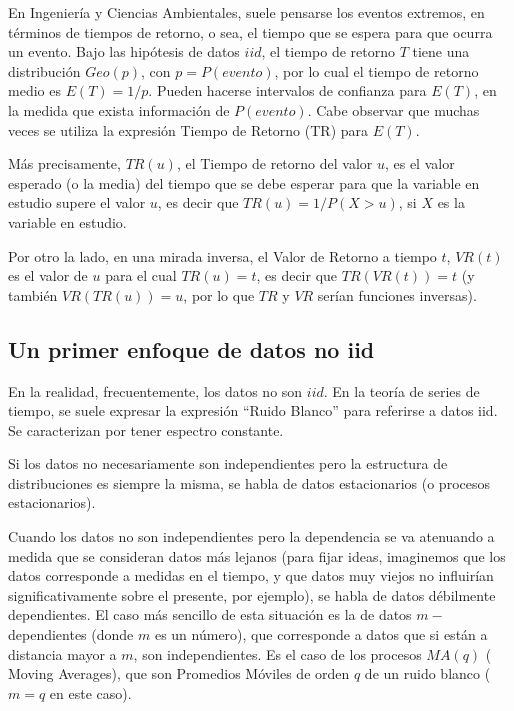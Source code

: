 \documentclass[
  12pt]{article}
\begin{document}
En Ingeniería y Ciencias Ambientales, suele pensarse los eventos
extremos, en términos de tiempos de retorno, o sea, el tiempo que se
espera para que ocurra un evento. Bajo las hipótesis de datos \(iid\),
el tiempo de retorno \(T\) tiene una distribución \(Geo(p)\), con
\(p = P(evento)\), por lo cual el tiempo de retorno medio es
\(E(T)=1/p\). Pueden hacerse intervalos de confianza para \(E(T)\), en
la medida que exista información de \(P(evento)\). Cabe observar que
muchas veces se utiliza la expresión Tiempo de Retorno (TR) para
\(E(T)\).

Más precisamente, \(TR(u)\), el Tiempo de retorno del valor \(u\), es el
valor esperado (o la media) del tiempo que se debe esperar para que la
variable en estudio supere el valor \(u\), es decir que
\(TR(u) = 1/P(X>u)\), si \(X\) es la variable en estudio.

Por otro la lado, en una mirada inversa, el Valor de Retorno a tiempo
\(t\), \(VR(t)\) es el valor de \(u\) para el cual \(TR(u)=t\), es decir
que \(TR(VR(t))=t\) (y también \(VR(TR(u))=u\), por lo que \(TR\) y
\(VR\) serían funciones inversas).

\subsection{Un primer enfoque de datos no
iid}\label{un-primer-enfoque-de-datos-no-iid}

En la realidad, frecuentemente, los datos no son \(iid\). En la teoría
de series de tiempo, se suele expresar la expresión ``Ruido Blanco''
para referirse a datos iid. Se caracterizan por tener espectro
constante.

Si los datos no necesariamente son independientes pero la estructura de
distribuciones es siempre la misma, se habla de datos estacionarios (o
procesos estacionarios).

Cuando los datos no son independientes pero la dependencia se va
atenuando a medida que se consideran datos más lejanos (para fijar
ideas, imaginemos que los datos corresponde a medidas en el tiempo, y
que datos muy viejos no influirían significativamente sobre el presente,
por ejemplo), se habla de datos débilmente dependientes. El caso más
sencillo de esta situación es la de datos \(m-\)dependientes (donde
\(m\) es un número), que corresponde a datos que si están a distancia
mayor a \(m\), son independientes. Es el caso de los procesos \(MA(q)\)
( Moving Averages), que son Promedios Móviles de orden \(q\) de un ruido
blanco (\(m=q\) en este caso).
\end{document}
